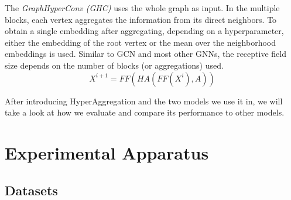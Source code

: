 \documentclass[conference]{IEEEtran}
\begin{document}
The \textit{GraphHyperConv (GHC)} uses the whole graph as input.
In the multiple blocks, each vertex aggregates the information from its direct neighbors.
To obtain a single embedding after aggregating, depending on a hyperparameter, either the embedding of the root vertex or the mean over the neighborhood embeddings is used.
Similar to GCN and most other GNNs, the receptive field size depends on the number of blocks (or aggregations) used.
\begin{equation*}
X^{i+1} = FF(HA(FF(X^i), A))    
\end{equation*}

After introducing HyperAggregation and the two models we use it in, we will take a look at how we evaluate and compare its performance to other models.

\section{Experimental Apparatus}
\label{sec:experimentalapparatus}


\subsection{Datasets}
\label{sec:datasets}
\end{document}
